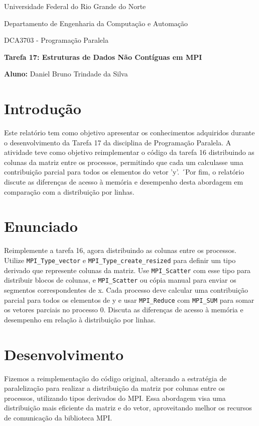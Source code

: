 \documentclass[a4paper, 12pt]{article}
\begin{document}
	
	\begin{center}
		Universidade Federal do Rio Grande do Norte
		
		Departamento de Engenharia da Computação e Automação  
		
		DCA3703 - Programação Paralela  
		
		\textbf{Tarefa 17: Estruturas de Dados Não Contíguas em MPI}  
		
		\textbf{Aluno:} Daniel Bruno Trindade da Silva  
	\end{center}  
	
	\section{Introdução}
	
	\hspace{0.62cm}Este relatório tem como objetivo apresentar os conhecimentos adquiridos durante o desenvolvimento da Tarefa 17 da disciplina de Programação Paralela. A atividade teve como objetivo reimplementar o código da tarefa 16 distribuindo as colunas da matriz entre os processos, permitindo que cada um calculasse uma contribuição parcial para todos os elementos do vetor 'y'. ´Por fim, o relatório discute as diferenças de acesso à memória e desempenho desta abordagem em comparação com a distribuição por linhas.
	
	\section{Enunciado}
	
	\hspace{0.62cm}Reimplemente a tarefa 16, agora distribuindo as colunas entre os processos. Utilize \texttt{MPI\_Type\_vector} e \texttt{MPI\_Type\_create\_resized} para definir um tipo derivado que represente colunas da matriz. Use \texttt{MPI\_Scatter} com esse tipo para distribuir blocos de colunas, e \texttt{MPI\_Scatter} ou cópia manual para enviar os segmentos correspondentes de x. Cada processo deve calcular uma contribuição parcial para todos os elementos de y e usar \texttt{MPI\_Reduce} com \texttt{MPI\_SUM} para somar os vetores parciais no processo 0. Discuta as diferenças de acesso à memória e desempenho em relação à distribuição por linhas.
	
	\section{Desenvolvimento}
	\hspace{0.62cm}Fizemos a reimplementação do código original, alterando a estratégia de paralelização para realizar a distribuição da matriz por colunas entre os processos, utilizando tipos derivados do MPI. Essa abordagem visa uma distribuição mais eficiente da matriz e do vetor, aproveitando melhor os recursos de comunicação da biblioteca MPI.
	
\end{document}
